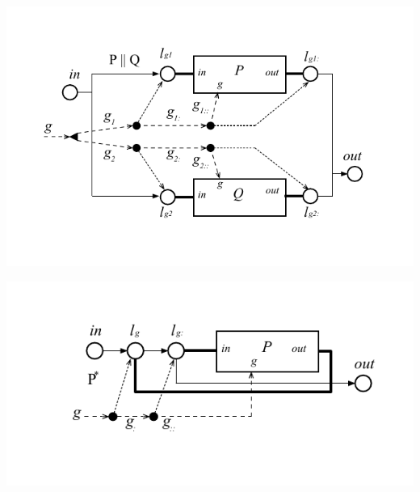 \documentclass{llncs}
\begin{document}
\includegraphics[scale=0.8]{images/PAR}

\includegraphics[scale=0.8]{images/STAR}




% 
% 
% 
% 
% 
% 
% 
\end{document}
